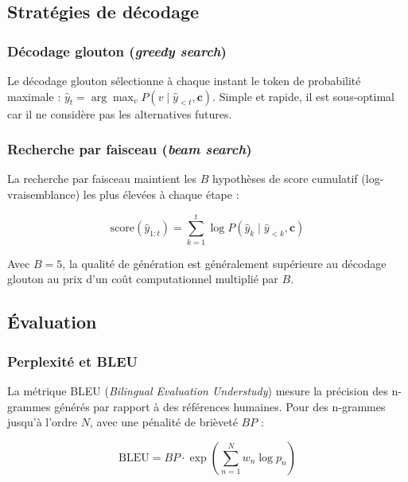 \documentclass[11pt,a4paper]{article}
\begin{document}
\subsection{Stratégies de décodage}

\subsubsection{Décodage glouton (\textit{greedy search})}

Le décodage glouton sélectionne à chaque instant le token de probabilité maximale :
$\hat{y}_t = \arg\max_v P(v \mid \hat{y}_{<t}, \mathbf{c})$. Simple et rapide,
il est sous-optimal car il ne considère pas les alternatives futures.

\subsubsection{Recherche par faisceau (\textit{beam search})}

La recherche par faisceau maintient les $B$ hypothèses de score cumulatif
(log-vraisemblance) les plus élevées à chaque étape :

\begin{equation}
  \mathrm{score}(\hat{y}_{1:t}) = \sum_{k=1}^{t} \log P(\hat{y}_k \mid \hat{y}_{<k}, \mathbf{c})
  \label{eq:beam_score}
\end{equation}

Avec $B = 5$, la qualité de génération est généralement supérieure au décodage glouton
au prix d'un coût computationnel multiplié par $B$.

\subsection{Évaluation}

\subsubsection{Perplexité et BLEU}

La métrique BLEU (\textit{Bilingual Evaluation Understudy}) \cite{papineni2002bleu}
mesure la précision des n-grammes générés par rapport à des références humaines.
Pour des n-grammes jusqu'à l'ordre $N$, avec une pénalité de brièveté $BP$ :

\begin{equation}
  \mathrm{BLEU} = BP \cdot \exp\!\left(\sum_{n=1}^{N} w_n \log p_n\right)
  \label{eq:bleu}
\end{equation}
\end{document}
